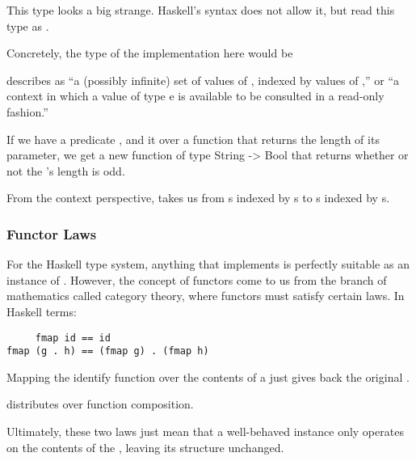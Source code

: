 \begin{notelist}
    \item \textbf{}
    \begin{notelist}
        \item This type looks a big strange. Haskell's syntax does not allow it, but read this type as .
        \item Concretely, the type of the  implementation here would be 
        \item \cite{typeclassopedia} describes  as ``a (possibly infinite) set of values of , indexed by
              values of ,'' or ``a context in which a value of type e is available to be consulted in a read-only fashion.''
        \item If we have a predicate , and  it over a function 
              that returns the length of its parameter, we get a new function of type {String -> Bool} that returns whether or
              not the 's length is odd.
        \item From the context perspective,  takes us from s indexed by s to s
              indexed by s.
    \end{notelist}
\end{notelist}

\subsubsection{Functor Laws}

For the Haskell type system, anything that implements  is perfectly suitable
as an instance of . However, the concept of functors come to us from the branch of mathematics called
category theory, where functors must satisfy certain laws. In Haskell terms:

\begin{lstlisting}
     fmap id == id
fmap (g . h) == (fmap g) . (fmap h)
\end{lstlisting}

\begin{notelist}
    \item Mapping the identify function over the contents of a  just gives back the original .
    \item {} distributes over function composition.
    \item Ultimately, these two laws just mean that a well-behaved  instance only operates on the
          contents of the , leaving its structure unchanged.
\end{notelist}

